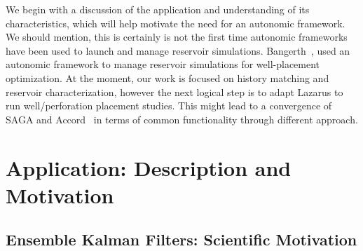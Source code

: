 \documentclass{sig-alternate}
\newcommand{\jhanote}[1]{ {\textcolor{red} { ***Jha: #1 }}}
\newcommand{\jhanote}[1]{}
\begin{document}


We begin with a discussion of the application and
understanding of its characteristics, which will help motivate the
need for an autonomic framework. We should mention, this is certainly
is not the first time autonomic frameworks have been used to launch
and manage reservoir simulations. Bangerth~\cite{bangerth}, used an
autonomic framework to manage reservoir simulations for well-placement
optimization. At the moment, our work is focused on history matching
and reservoir characterization, however the next logical step is to
adapt Lazarus to run well/perforation placement studies. This might
lead to a convergence of SAGA and Accord~\cite{accord} in terms of
common functionality through different approach.



\section{Application: Description and Motivation} 

\subsection{Ensemble Kalman Filters: Scientific Motivation}
\end{document}
